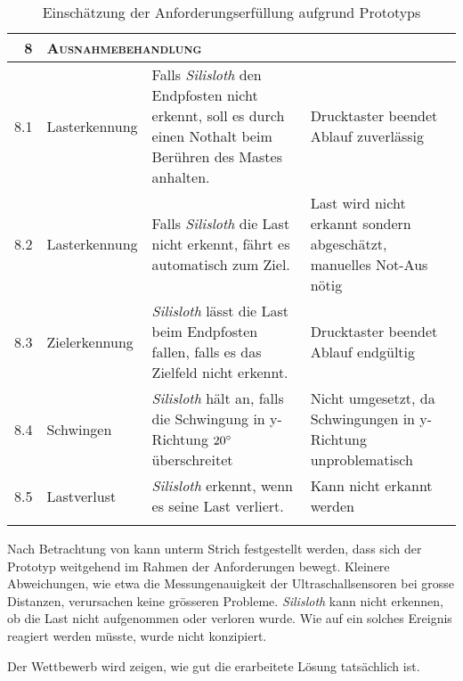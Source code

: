 {\begin{longtable}{|r|p{2cm}|p{5cm}|p{5.5cm}|}
    \hline
    \textsc{8} & \multicolumn{3}{l|}{\textsc{Ausnahmebehandlung}} \\
    \hline
    8.1 & Lasterkennung & Falls \textit{Silisloth} den Endpfosten nicht erkennt, soll es durch einen Nothalt beim Berühren des Mastes anhalten. & Drucktaster beendet Ablauf zuverlässig \\
8.2 & Lasterkennung & Falls \textit{Silisloth} die Last nicht erkennt, fährt es automatisch zum Ziel. & Last wird nicht erkannt sondern abgeschätzt, manuelles Not-Aus nötig \\
8.3 & Zielerkennung & \textit{Silisloth} lässt die Last beim Endpfosten fallen, falls es das Zielfeld nicht erkennt. & Drucktaster beendet Ablauf endgültig \\
    8.4 & Schwingen & \textit{Silisloth} hält an, falls die Schwingung in y-Richtung $20\degree$ überschreitet & Nicht umgesetzt, da Schwingungen in y-Richtung unproblematisch \\
8.5 & Lastverlust & \textit{Silisloth} erkennt, wenn es seine Last verliert. & Kann nicht erkannt werden \\
\hline
\caption{Einschätzung der Anforderungserfüllung aufgrund Prototyps \label{tbl:review-anforderungen}}
\end{longtable}
}

Nach Betrachtung von  kann unterm Strich festgestellt werden, dass sich der Prototyp weitgehend im Rahmen der Anforderungen bewegt. Kleinere Abweichungen, wie etwa die Messungenauigkeit der Ultraschallsensoren bei grosse Distanzen, verursachen keine grösseren Probleme. \textit{Silisloth} kann nicht erkennen, ob die Last nicht aufgenommen oder verloren wurde. Wie auf ein solches Ereignis reagiert werden müsste, wurde nicht konzipiert.

Der Wettbewerb wird zeigen, wie gut die erarbeitete Lösung tatsächlich ist.
